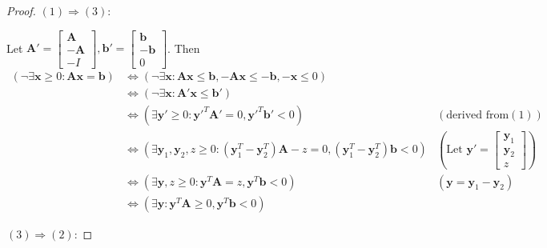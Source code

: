    \begin{proof}
        $(1)\Rightarrow(3)$:

        Let $\mathbf{A}'=\left[
        \begin{matrix}
            \mathbf{A} \\
            -\mathbf{A} \\
            -I
        \end{matrix}
        \right],
        \mathbf{b}'=\left[
        \begin{matrix}
            \mathbf{b} \\
            -\mathbf{b} \\
            0
        \end{matrix}
        \right]$.
        Then \begin{align*}
            (\neg \exists \mathbf{x}\ge 0: \mathbf{A}\mathbf{x}= \mathbf{b})&\iff(\neg \exists \mathbf{x}: \mathbf{A}\mathbf{x}\le \mathbf{b},-\mathbf{A}\mathbf{x}\le-\mathbf{b},-\mathbf{x}\le 0)\\
                                        &\iff(\neg \exists \mathbf{x}: \mathbf{A}'\mathbf{x}\le \mathbf{b}') \\
                                        &\iff(\exists \mathbf{y}'\ge 0 :\mathbf{y}'^{T}\mathbf{A}'=0,\mathbf{y}'^{T}\mathbf{b}'<0) &(\text{derived from} (1))\\
                                        &\iff(\exists \mathbf{y}_1,\mathbf{y}_2,z\ge 0:(\mathbf{y}_{1}^{T}-\mathbf{y}_{2}^{T})\mathbf{A}-z=0,(\mathbf{y}_{1}^{T}-\mathbf{y}_{2}^{T})\mathbf{b}<0) &(\text{Let }\mathbf{y}'=\left[\begin{matrix} \mathbf{y}_1 \\\mathbf{y}_2 \\z \end{matrix}\right])\\
                                        &\iff(\exists \mathbf{y},z\ge 0:\mathbf{y}^{T}\mathbf{A}=z,\mathbf{y}^{T}\mathbf{b}<0) &(\mathbf{y}=\mathbf{y}_1-\mathbf{y}_2) \\
                                        &\iff(\exists \mathbf{y} :\mathbf{y}^{T}\mathbf{A}\ge 0,\mathbf{y}^{T}\mathbf{b}<0)
        \end{align*}

        $(3)\Rightarrow(2)$:


\end{proof}
